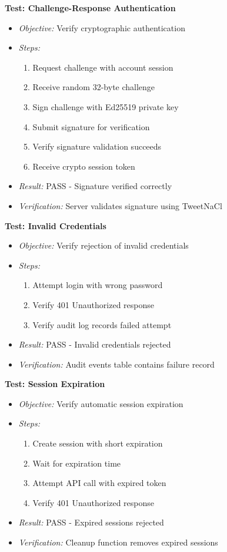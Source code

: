 \textbf{Test: Challenge-Response Authentication}
\begin{itemize}
    \item \textit{Objective:} Verify cryptographic authentication
    \item \textit{Steps:}
    \begin{enumerate}
        \item Request challenge with account session
        \item Receive random 32-byte challenge
        \item Sign challenge with Ed25519 private key
        \item Submit signature for verification
        \item Verify signature validation succeeds
        \item Receive crypto session token
    \end{enumerate}
    \item \textit{Result:} PASS - Signature verified correctly
    \item \textit{Verification:} Server validates signature using TweetNaCl
\end{itemize}

\textbf{Test: Invalid Credentials}
\begin{itemize}
    \item \textit{Objective:} Verify rejection of invalid credentials
    \item \textit{Steps:}
    \begin{enumerate}
        \item Attempt login with wrong password
        \item Verify 401 Unauthorized response
        \item Verify audit log records failed attempt
    \end{enumerate}
    \item \textit{Result:} PASS - Invalid credentials rejected
    \item \textit{Verification:} Audit events table contains failure record
\end{itemize}

\textbf{Test: Session Expiration}
\begin{itemize}
    \item \textit{Objective:} Verify automatic session expiration
    \item \textit{Steps:}
    \begin{enumerate}
        \item Create session with short expiration
        \item Wait for expiration time
        \item Attempt API call with expired token
        \item Verify 401 Unauthorized response
    \end{enumerate}
    \item \textit{Result:} PASS - Expired sessions rejected
    \item \textit{Verification:} Cleanup function removes expired sessions
\end{itemize}

